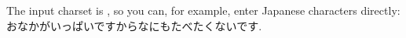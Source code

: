 The input charset is , so you can, for example, enter Japanese characters directly: おなかがいっぱいですからなにもたべたくないです.

